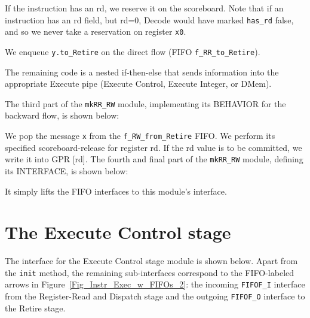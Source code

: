 If the instruction has an rd, we reserve it on the scoreboard.  Note
that if an instruction has an rd field, but rd=0, Decode would have
marked \verb|has_rd| false, and so we never take a reservation on
register \verb|x0|.

We enqueue \verb|y.to_Retire| on the direct flow (FIFO
\verb|f_RR_to_Retire|).

The remaining code is a nested if-then-else that sends information
into the appropriate Execute pipe (Execute Control, Execute Integer,
or DMem).








The third part of the \verb|mkRR_RW| module, implementing its BEHAVIOR
for the backward flow, is shown below:


We pop the message \verb|x| from the \verb|f_RW_from_Retire| FIFO.  We
perform its specified scoreboard-release for register rd.  If the rd
value is to be committed, we write it into GPR [rd].  The fourth and
final part of the \verb|mkRR_RW| module, defining its INTERFACE, is
shown below:


It simply lifts the FIFO interfaces to this module's interface.


\section{The Execute Control stage}

\label{Sec_Fife_Control_stage}

The interface for the Execute Control stage module is shown below.
Apart from the \verb|init| method, the remaining sub-interfaces
correspond to the FIFO-labeled arrows in
Figure~\ref{Fig_Instr_Exec_w_FIFOs_2}: the incoming \verb|FIFOF_I|
interface from the Register-Read and Dispatch stage and the outgoing
\verb|FIFOF_O| interface to the Retire stage.


